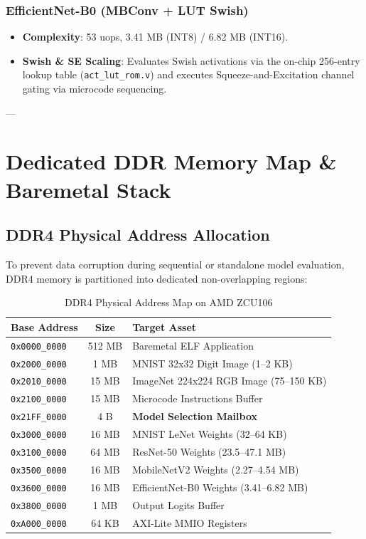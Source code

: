 \documentclass[10pt,journal,compsoc]{IEEEtran}
\begin{document}
\subsubsection{EfficientNet-B0 (MBConv + LUT Swish)}
\begin{itemize}
    \item \textbf{Complexity}: 53 uops, 3.41 MB (INT8) / 6.82 MB (INT16).
    \item \textbf{Swish \& SE Scaling}: Evaluates Swish activations via the on-chip 256-entry lookup table (\texttt{act\_lut\_rom.v}) and executes Squeeze-and-Excitation channel gating via microcode sequencing.
\end{itemize}

---

\section{Dedicated DDR Memory Map \& Baremetal Stack}

\subsection{DDR4 Physical Address Allocation}
To prevent data corruption during sequential or standalone model evaluation, DDR4 memory is partitioned into dedicated non-overlapping regions:

\begin{table}[h]
\caption{DDR4 Physical Address Map on AMD ZCU106}
\label{tab:ddr_map}
\centering
\scriptsize
\begin{tabular}{lcl}
\toprule
\textbf{Base Address} & \textbf{Size} & \textbf{Target Asset} \\
\midrule
\texttt{0x0000\_0000} & 512 MB & Baremetal ELF Application \\
\texttt{0x2000\_0000} & 1 MB & MNIST 32x32 Digit Image (1--2 KB) \\
\texttt{0x2010\_0000} & 15 MB & ImageNet 224x224 RGB Image (75--150 KB) \\
\texttt{0x2100\_0000} & 15 MB & Microcode Instructions Buffer \\
\texttt{0x21FF\_0000} & 4 B & \textbf{Model Selection Mailbox} \\
\texttt{0x3000\_0000} & 16 MB & MNIST LeNet Weights (32--64 KB) \\
\texttt{0x3100\_0000} & 64 MB & ResNet-50 Weights (23.5--47.1 MB) \\
\texttt{0x3500\_0000} & 16 MB & MobileNetV2 Weights (2.27--4.54 MB) \\
\texttt{0x3600\_0000} & 16 MB & EfficientNet-B0 Weights (3.41--6.82 MB) \\
\texttt{0x3800\_0000} & 1 MB & Output Logits Buffer \\
\texttt{0xA000\_0000} & 64 KB & AXI-Lite MMIO Registers \\
\bottomrule
\end{tabular}
\end{table}
\end{document}
